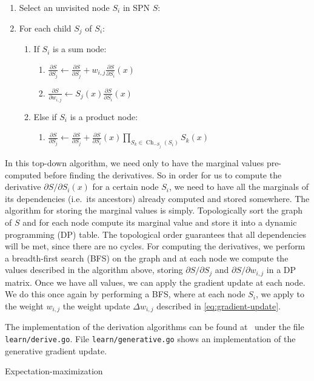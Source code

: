 \documentclass{amsart}
\makeatletter
\def\subsection{\@startsection{subsection}{3}%
  \z@{.5\linespacing\@plus.7\linespacing}{.1\linespacing}%
  {\normalfont}}
\DeclareMathOperator*{\Ch}{\text{Ch}}
\theoremstyle{plain}
\numberwithin{equation}{section}
\newcommand{\code}[1]{\lstinline[mathescape=true]{#1}}
\newcommand{\ddspn}[2]{\frac{\partial#1}{\partial#2}}
\newcommand{\iddspn}[2]{\partial#1/\partial#2}
\makeatother
\begin{document}
\begin{enumerate}[label=\arabic*.]
  \item Select an unvisited node $S_i$ in SPN $S$:
  \item For each child $S_j$ of $S_i$:
    \begin{enumerate}[label*=\arabic*.]
      \item If $S_i$ is a sum node:
        \begin{enumerate}[label*=\arabic*.]
          \item $\ddspn{S}{S_j}\gets\ddspn{S}{S_j}+w_{i,j}\ddspn{S}{S_i}(x)$
          \item $\ddspn{S}{w_{i,j}}\gets S_j(x)\ddspn{S}{S_i}(x)$
        \end{enumerate}
      \item Else if $S_i$ is a product node:
        \begin{enumerate}[label*=\arabic*]
          \item $\ddspn{S}{S_j}\gets\ddspn{S}{S_j}+\ddspn{S}{S_i}(x)\prod_{S_k\in\Ch_{-S_j}(S_i)}
            S_k(x)$
        \end{enumerate}
    \end{enumerate}
\end{enumerate}

In this top-down algorithm, we need only to have the marginal values pre-computed before finding
the derivatives. So in order for us to compute the derivative $\partial S/\partial S_i(x)$ for a
certain node $S_i$, we need to have all the marginals of its dependencies (i.e.\
its ancestors) already computed and stored somewhere. The algorithm for storing the marginal values
is simply. Topologically sort the graph of $S$ and for each node compute its marginal value and
store it into a dynamic programming (DP) table. The topological order guarantees that all
dependencies will be met, since there are no cycles. For computing the derivatives, we perform a
breadth-first search (BFS) on the graph and at each node we compute the values described in the
algorithm above, storing $\iddspn{S}{S_j}$ and $\iddspn{S}{w_{i,j}}$ in a DP matrix. Once we have
all values, we can apply the gradient update at each node. We do this once again by performing a
BFS, where at each node $S_i$, we apply to the weight $w_{i,j}$ the weight update $\Delta w_{i,j}$
described in \autoref{eq:gradient-update}.

The implementation of the derivation algorithms can be found at~\cite{gospn} under the file
\code{learn/derive.go}. File \code{learn/generative.go} shows an implementation of the generative
gradient update.

\subsection{Expectation-maximization}


\printbibliography[]
\end{document}
